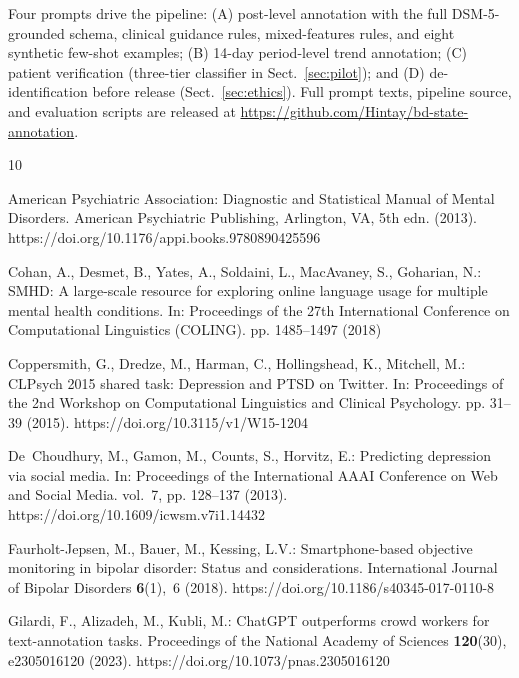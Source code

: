 \documentclass[runningheads]{llncs}
\begin{document}
Four prompts drive the pipeline: (A) post-level annotation with the full DSM-5-grounded schema, clinical guidance rules, mixed-features rules, and eight synthetic few-shot examples; (B) 14-day period-level trend annotation; (C) patient verification (three-tier classifier in Sect.~\ref{sec:pilot}); and (D) de-identification before release (Sect.~\ref{sec:ethics}). Full prompt texts, pipeline source, and evaluation scripts are released at \url{https://github.com/Hintay/bd-state-annotation}.

\begin{thebibliography}{10}
\providecommand{\url}[1]{\texttt{#1}}
\providecommand{\urlprefix}{URL }
\providecommand{\doi}[1]{https://doi.org/#1}

{American Psychiatric Association}: Diagnostic and Statistical Manual of Mental
  Disorders. American Psychiatric Publishing, Arlington, VA, 5th edn. (2013).
  \doi{10.1176/appi.books.9780890425596}

Cohan, A., Desmet, B., Yates, A., Soldaini, L., MacAvaney, S., Goharian, N.:
  {SMHD}: A large-scale resource for exploring online language usage for
  multiple mental health conditions. In: Proceedings of the 27th International
  Conference on Computational Linguistics (COLING). pp. 1485--1497 (2018)

Coppersmith, G., Dredze, M., Harman, C., Hollingshead, K., Mitchell, M.:
  {CLPsych 2015} shared task: Depression and {PTSD} on {Twitter}. In:
  Proceedings of the 2nd Workshop on Computational Linguistics and Clinical
  Psychology. pp. 31--39 (2015). \doi{10.3115/v1/W15-1204}

De~Choudhury, M., Gamon, M., Counts, S., Horvitz, E.: Predicting depression via
  social media. In: Proceedings of the International AAAI Conference on Web and
  Social Media. vol.~7, pp. 128--137 (2013). \doi{10.1609/icwsm.v7i1.14432}

Faurholt-Jepsen, M., Bauer, M., Kessing, L.V.: Smartphone-based objective
  monitoring in bipolar disorder: Status and considerations. International
  Journal of Bipolar Disorders  \textbf{6}(1),~6 (2018).
  \doi{10.1186/s40345-017-0110-8}

Gilardi, F., Alizadeh, M., Kubli, M.: {ChatGPT} outperforms crowd workers for
  text-annotation tasks. Proceedings of the National Academy of Sciences
  \textbf{120}(30),  e2305016120 (2023). \doi{10.1073/pnas.2305016120}


\end{thebibliography}
\end{document}
